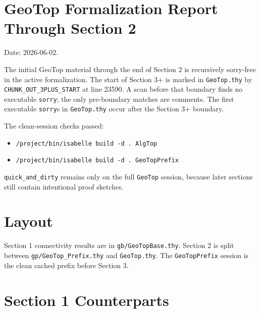 \documentclass{article}
\begin{document}
\section*{GeoTop Formalization Report Through Section 2}

Date: 2026-06-02.

The initial GeoTop material through the end of Section 2 is recursively
sorry-free in the active formalization.  The start of Section 3+ is marked in
\texttt{GeoTop.thy} by \texttt{CHUNK\_OUT\_3PLUS\_START} at line 23590.  A scan
before that boundary finds no executable \texttt{sorry}; the only pre-boundary
matches are comments.  The first executable \texttt{sorry}s in
\texttt{GeoTop.thy} occur after the Section 3+ boundary.

The clean-session checks passed:
\begin{itemize}
\item \texttt{/project/bin/isabelle build -d . AlgTop}
\item \texttt{/project/bin/isabelle build -d . GeoTopPrefix}
\end{itemize}

\texttt{quick\_and\_dirty} remains only on the full \texttt{GeoTop} session,
because later sections still contain intentional proof sketches.

\section*{Layout}

Section 1 connectivity results are in \texttt{gb/GeoTopBase.thy}.  Section 2 is
split between \texttt{gp/GeoTop\_Prefix.thy} and \texttt{GeoTop.thy}.  The
\texttt{GeoTopPrefix} session is the clean cached prefix before Section 3.

\section*{Section 1 Counterparts}
\end{document}
